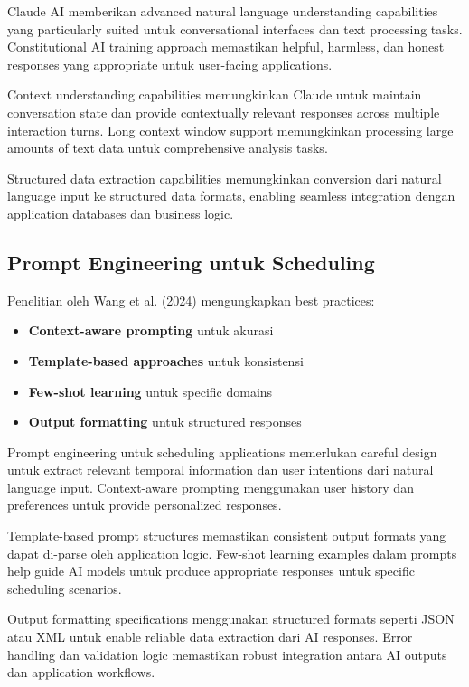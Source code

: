 Claude AI memberikan advanced natural language understanding capabilities yang particularly suited untuk conversational interfaces dan text processing tasks. Constitutional AI training approach memastikan helpful, harmless, dan honest responses yang appropriate untuk user-facing applications.

Context understanding capabilities memungkinkan Claude untuk maintain conversation state dan provide contextually relevant responses across multiple interaction turns. Long context window support memungkinkan processing large amounts of text data untuk comprehensive analysis tasks.

Structured data extraction capabilities memungkinkan conversion dari natural language input ke structured data formats, enabling seamless integration dengan application databases dan business logic.

\subsection{Prompt Engineering untuk Scheduling}

Penelitian oleh Wang et al. (2024) mengungkapkan best practices:

\begin{itemize}
\item \textbf{Context-aware prompting} untuk akurasi
\item \textbf{Template-based approaches} untuk konsistensi
\item \textbf{Few-shot learning} untuk specific domains
\item \textbf{Output formatting} untuk structured responses
\end{itemize}

Prompt engineering untuk scheduling applications memerlukan careful design untuk extract relevant temporal information dan user intentions dari natural language input. Context-aware prompting menggunakan user history dan preferences untuk provide personalized responses.

Template-based prompt structures memastikan consistent output formats yang dapat di-parse oleh application logic. Few-shot learning examples dalam prompts help guide AI models untuk produce appropriate responses untuk specific scheduling scenarios.

Output formatting specifications menggunakan structured formats seperti JSON atau XML untuk enable reliable data extraction dari AI responses. Error handling dan validation logic memastikan robust integration antara AI outputs dan application workflows.

